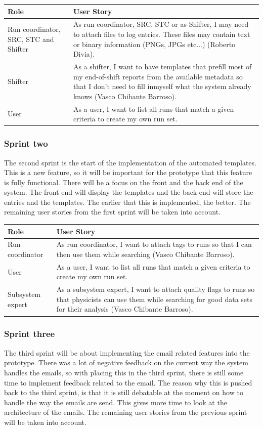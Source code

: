 \documentclass[paper=a4, fontsize=11pt,twoside]{scrartcl}	%
\begin{document}
\begin{longtable}{ | p{4cm} | p{10cm} |}
\hline
Role & User Story \\ \hline
Run coordinator, SRC, STC and Shifter& As run coordinator, SRC, STC or as Shifter, I may need to attach files to log entries. These files may contain text or binary information (PNGs, JPGs etc...) (Roberto Divia).  \\ \hline
Shifter &  As a shifter, I want to have templates that prefill most of my end-of-shift reports from the available metadata so that I don't need to fill inmyself what the system already knows (Vasco Chibante Barroso). \\ \hline
User &  As a user, I want to list all runs that match a given criteria to create my own run set. \\ \hline

\end{longtable}

\subsubsection{Sprint two}
The second sprint is the start of the implementation of the automated templates. This is a new feature, so it will be important for the prototype that this feature is fully functional. There will be a focus on the front and the back end of the system. The front end will display the templates and the back end will store the entries and the templates. The earlier that this is implemented, the better. The remaining user stories from the first sprint will be taken into account.

\begin{longtable}{ | p{4cm} | p{10cm} |}
\hline
Role & User Story \\ \hline
Run coordinator &  As run coordinator, I want to attach tags to runs so that I can then use them while searching (Vasco Chibante Barroso). \\ \hline
User &  As a user, I want to list all runs that match a given criteria to create my own run set. \\ \hline
Subsystem expert & As a subsystem expert, I want to attach quality flags to runs so that
physicists can use them while searching for good data sets for their analysis (Vasco Chibante Barroso).  \\ \hline

\end{longtable}

\subsubsection{Sprint three}
The third sprint will be about implementing the email related features into the prototype. There was a lot of negative feedback on the current way the system handles the emails, so with placing this in the third sprint, there is still some time to implement feedback related to the email. The reason why this is pushed back to the third sprint, is that it is still debatable at the moment on how to handle the way the emails are send. This gives more time to look at the architecture of the emails. The remaining user stories from the previous sprint will be taken into account.
\end{document}
